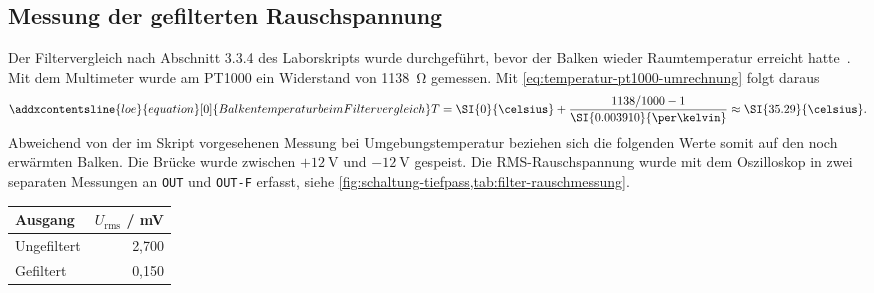 \documentclass[11pt,a4paper]{scrartcl}
\begin{document}
\subsection{Messung der gefilterten Rauschspannung}
Der Filtervergleich nach Abschnitt 3.3.4 des Laborskripts wurde durchgeführt, bevor der Balken wieder Raumtemperatur erreicht hatte~\cite{laborskript}.
Mit dem Multimeter wurde am PT1000 ein Widerstand von \SI{1138}{\ohm} gemessen.
Mit \cref{eq:temperatur-pt1000-umrechnung} folgt daraus
\begin{equation}
  \addxcontentsline{loe}{equation}[\theequation]{Balkentemperatur beim Filtervergleich}
  T=\SI{0}{\celsius}+\frac{1138/1000-1}{\SI{0.003910}{\per\kelvin}}
  \approx\SI{35.29}{\celsius}.
  \label{eq:filter-messtemperatur}
\end{equation}
Abweichend von der im Skript vorgesehenen Messung bei Umgebungstemperatur beziehen sich die folgenden Werte somit auf den noch erwärmten Balken.
Die Brücke wurde zwischen $+\SI{12}{\volt}$ und $-\SI{12}{\volt}$ gespeist.
Die RMS-Rauschspannung wurde mit dem Oszilloskop in zwei separaten Messungen an \texttt{OUT} und \texttt{OUT-F} erfasst, siehe \cref{fig:schaltung-tiefpass,tab:filter-rauschmessung}.


\begin{center}
\begin{minipage}{\linewidth}
  \centering
  \captionsetup{hypcap=false}
  \label{tab:filter-rauschmessung}
  \begin{tabular}{lr}
    \toprule
    Ausgang & $U_\mathrm{rms}$ / \si{\milli\volt} \\
    \midrule
    Ungefiltert & 2,700 \\
    Gefiltert   & 0,150 \\
    \bottomrule
  \end{tabular}
\end{minipage}
\end{center}
\end{document}
